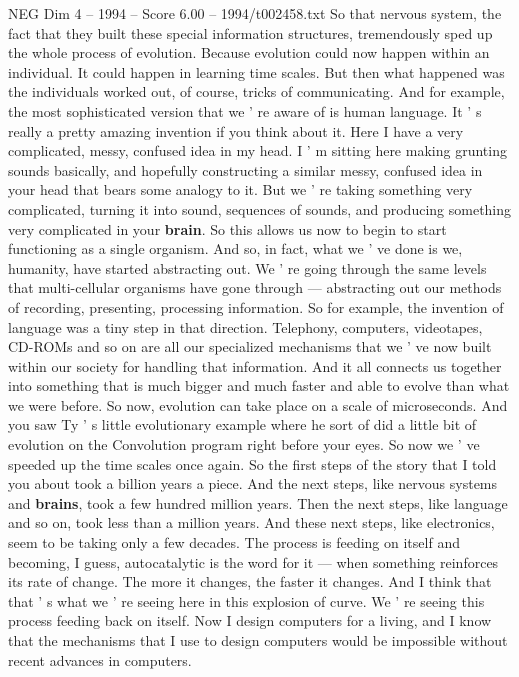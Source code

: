 \begin{textsample}{NEG Dim 4 – 1994 – Score 6.00 – 1994/t002458.txt}
So that nervous system, the fact that they built these special information structures, tremendously sped up the whole process of evolution.
Because evolution could now happen within an individual.
It could happen in learning time scales.
But then what happened was the individuals worked out, of course, tricks of communicating.
And for example, the most sophisticated version that we ' re aware of is human language.
It ' s really a pretty amazing invention if you think about it.
Here I have a very complicated, messy, confused idea in my head.
I ' m sitting here making grunting sounds basically, and hopefully constructing a similar messy, confused idea in your head that bears some analogy to it.
But we ' re taking something very complicated, turning it into sound, sequences of sounds, and producing something very complicated in your \textbf{brain}.
So this allows us now to begin to start functioning as a single organism.
And so, in fact, what we ' ve done is we, humanity, have started abstracting out.
We ' re going through the same levels that multi-cellular organisms have gone through — abstracting out our methods of recording, presenting, processing information.
So for example, the invention of language was a tiny step in that direction.
Telephony, computers, videotapes, CD-ROMs and so on are all our specialized mechanisms that we ' ve now built within our society for handling that information.
And it all connects us together into something that is much bigger and much faster and able to evolve than what we were before.
So now, evolution can take place on a scale of microseconds.
And you saw Ty ' s little evolutionary example where he sort of did a little bit of evolution on the Convolution program right before your eyes.
So now we ' ve speeded up the time scales once again.
So the first steps of the story that I told you about took a billion years a piece.
And the next steps, like nervous systems and \textbf{brains}, took a few hundred million years.
Then the next steps, like language and so on, took less than a million years.
And these next steps, like electronics, seem to be taking only a few decades.
The process is feeding on itself and becoming, I guess, autocatalytic is the word for it — when something reinforces its rate of change.
The more it changes, the faster it changes.
And I think that that ' s what we ' re seeing here in this explosion of curve.
We ' re seeing this process feeding back on itself.
Now I design computers for a living, and I know that the mechanisms that I use to design computers would be impossible without recent advances in computers.

\end{textsample}
